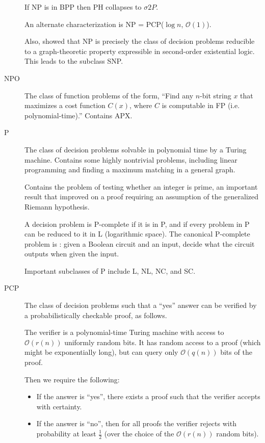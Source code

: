 \documentclass[a4paper]{article}
\newcommand{\cls}[1]{\rm{#1}}
\newcommand{\probl}[1]{\text{\textsc{#1}}}
\begin{document}
\begin{appendices}
\begin{description}
    If NP is in \cls{BPP} then \cls{PH} collapses to $\sigma 2P$.

    An alternate characterization is \cls{NP} = \cls{PCP($\log{n}$, $\mathcal{O}(1)$)}.

    Also, showed that \cls{NP} is precisely the class of decision problems reducible to a graph-theoretic property expressible in second-order existential logic. This leads to the subclass \cls{SNP}.

  \item[\cls{NPO}] The class of function problems of the form, ``Find any $n$-bit string $x$ that maximizes a cost function $C(x)$, where $C$ is computable in \cls{FP} (i.e. polynomial-time).'' Contains \cls{APX}.

  \item[\cls{P}] The class of decision problems solvable in polynomial time by a Turing machine.
    Contains some highly nontrivial problems, including linear programming and finding a maximum matching in a general graph.

    Contains the problem of testing whether an integer is prime, an important result that improved on a proof requiring an assumption of the generalized Riemann hypothesis.

    A decision problem is \cls{P}-complete if it is in \cls{P}, and if every problem in \cls{P} can be reduced to it in \cls{L} (logarithmic space).  The canonical \cls{P}-complete problem is \probl{Circuit Evaluation}: given a Boolean circuit and an input, decide what the circuit outputs when given the input.

    Important subclasses of \cls{P} include \cls{L}, \cls{NL}, \cls{NC}, and \cls{SC}.

  \item[\cls{PCP}] The class of decision problems such that a ``yes'' answer can be verified by a probabilistically checkable proof, as follows.

    The verifier is a polynomial-time Turing machine with access to $\mathcal{O}(r(n))$ uniformly random bits.  It has random access to a proof (which might be exponentially long), but can query only $\mathcal{O}(q(n))$ bits of the proof.

    Then we require the following:
    \begin{itemize}
      \item If the answer is ``yes'', there exists a proof such that the verifier accepts with certainty.
      \item If the answer is ``no'', then for all proofs the verifier rejects with probability at least $\frac12$ (over the choice of the $\mathcal{O}(r(n))$ random bits).
    \end{itemize}


\end{description}
\end{appendices}
\end{document}
